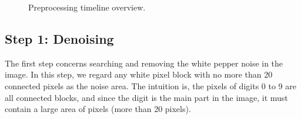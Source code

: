 \documentclass{article}
\begin{document}
\begin{figure}[!htb]
	\centering
	\caption{Preprocessing timeline overview.}
	\label{fig:preoverview}
\end{figure}

\subsection{Step 1: Denoising}
The first step concerns searching and removing the white pepper noise in the image. In this step, we regard any white pixel block with no more than 20 connected pixels as the noise area. The intuition is, the pixels of digits 0 to 9 are all connected blocks, and since the digit is the main part in the image, it must contain a large area of pixels (more than 20 pixels). 
\end{document}
